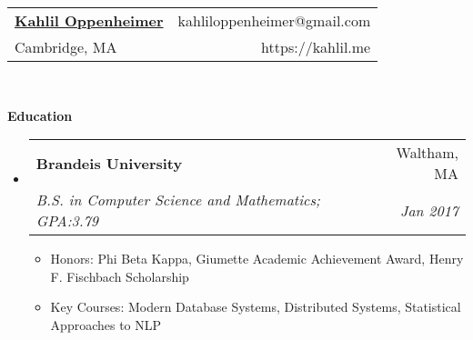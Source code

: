 \documentclass[letterpaper,11pt]{article}
\makeatletter
\newcommand{\resitem}[1]{\item #1 \vspace{-2pt}}
\newcommand{\resheading}[1]{{\large \colorbox{mygrey}{\begin{minipage}{\textwidth}{\textbf{#1 \vphantom{p\^{E}}}}\end{minipage}}}}
\newcommand{\ressubheading}[4]{
\begin{tabular*}{6.5in}{l@{\extracolsep{\fill}}r}
		\textbf{#1} & #2 \\
		\textit{#3} & \textit{#4} \\
\end{tabular*}\vspace{-6pt}}
\makeatother
\begin{document}
\newcommand{\mywebheader}{
\begin{tabular*}{7in}{l@{\extracolsep{\fill}}r}
	\textbf{\LARGE \href{https://kahlil.me}{Kahlil Oppenheimer}} & {kahliloppenheimer@gmail.com} \\
Cambridge, MA & https://kahlil.me
	\end{tabular*}
\\
\vspace{0.1in}}

\mywebheader

\resheading{Education}
	\begin{itemize}
		\item
			\ressubheading{Brandeis University}{Waltham, MA}{B.S. in Computer Science and Mathematics; GPA:3.79}{Jan 2017}
				{ \footnotesize
				\begin{itemize}
                    \resitem{Honors: Phi Beta Kappa, Giumette Academic Achievement Award, Henry F. Fischbach Scholarship}
					\resitem{Key Courses: Modern Database Systems, Distributed Systems, Statistical Approaches to NLP}
				\end{itemize}
				}
	\end{itemize} %
\end{document}
